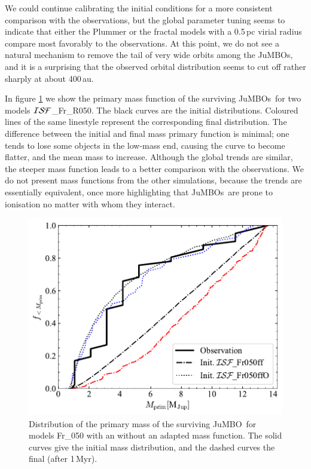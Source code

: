 \documentclass[submission,phys]{lib/SciPost}
\newcommand{\jumbo}{\mbox{JuMBO}}
\newcommand{\jumbos}{\mbox{JuMBOs}}
\begin{document}
We could continue calibrating the initial conditions for a more
consistent comparison with the observations, but the global parameter
tuning seems to indicate that either the Plummer or the fractal models
with a 0.5\,pc virial radius compare most favorably to the
observations.  At this point, we do not see a natural mechanism to
remove the tail of very wide orbits among the \jumbos, and it is a 
surprising that the observed orbital distribution seems to cut off
rather sharply at about 400\,au.

In figure \ref{Fig:Mdistr_F05} we show the primary mass function of
the surviving \jumbos\, for two models ${\cal ISF}$\_Fr\_R050.  The
black curves are the initial distributions. Coloured lines of the same
linestyle represent the corresponding final distribution.  The
difference between the initial and final mass primary function is
minimal; one tends to lose some objects in the low-mass end, causing
the curve to become flatter, and the mean mass to increase.  Although
the global trends are similar, the steeper mass function leads to a
better comparison with the observations.  We do not present mass
functions from the other simulations, because the trends are
essentially equivalent, once more highlighting that \jumbos\ are prone
to ionisation no matter with whom they interact.

\begin{figure}
    \centering
    \includegraphics[width=0.75\columnwidth]{figures/Frac_FF_GenObs_mprim.pdf}
    \caption{Distribution of the primary mass of the surviving
      \jumbo\, for models Fr\_050 with an without an adapted mass
      function. The solid curves give the initial mass distribution,
      and the dashed curves the final (after 1\,Myr).}
         \label{Fig:Mdistr_F05}
\end{figure}
\end{document}
